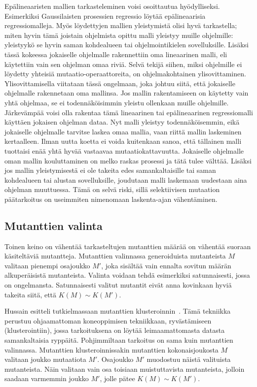 \documentclass{tktltiki}
\begin{document}
Epälineaaristen mallien tarkasteleminen voisi osoittautua hyödylliseksi. Esimerkiksi Gaussilaisten prosessien regressio löytää epälineaarisia regressiomalleja. Myös löydettyjen mallien yleistymistä olisi hyvä tarkastella; miten hyvin tämä joistain ohjelmista opittu malli yleistyy muille ohjelmille: yleistyykö se hyvin saman kohdealueen tai ohjelmointikielen sovelluksille. Lisäksi tässä kokeessa jokaiselle ohjelmalle rakennettiin oma lineaarinen malli, eli käytettiin vain sen ohjelman omaa riviä. Selvä tekijä siihen, miksi ohjelmille ei löydetty yhteisiä mutaatio-operaattoreita, on ohjelmakohtainen ylisovittaminen. Ylisovittamisella viitataan tässä ongelmaan, joka johtuu siitä, että jokaiselle ohjelmalle rakennetaan oma mallinsa. Jos mallin rakentamiseen on käytetty vain yhtä ohjelmaa, se ei todennäköisimmin yleistu ollenkaan muille ohjelmille. Järkevämpää voisi olla rakentaa tämä lineaarinen tai epälineaarinen regressiomalli käyttäen jokaisen ohjelman dataa. Nyt malli yleistyy todennäköisemmin, eikä jokaiselle ohjelmalle tarvitse laskea omaa mallia, vaan riittä mallin laskeminen kertaalleen. Ilman uutta koetta ei voida kuitenkaan sanoa, että tällainen malli tuottaisi enää yhtä hyvää vastaavaa mutaatiokattavuutta. Jokaiselle ohjelmalle oman mallin kouluttaminen on melko raskas prosessi ja tätä tulee välttää. Lisäksi jos mallin yleistymisestä ei ole takeita edes samankaltaisille tai saman kohdealueen tai alustan sovelluksille, joudutaan malli laskemaan uudestaan aina ohjelman muuttuessa. Tämä on selvä riski, sillä selektiivisen mutaation päätarkoitus on useimmiten nimenomaan laskenta-ajan vähentäminen.

\subsection{Mutanttien valinta}
Toinen keino on vähentää tarkasteltujen mutanttien määrää on vähentää suoraan käsiteltäviä mutantteja. Mutanttien valinnassa generoiduista mutanteista $M$ valitaan pienempi osajoukko $M'$, joka sisältää vain ennalta sovitun määrän alkuperäisistä mutanteista. Valinta voidaan tehdä esimerkiksi satunnaisesti, jossa on ongelmansta. Satunnaisesti valitut mutantit eivät anna kovinkaan hyviä takeita siitä, että $K(M) \sim K(M')$. 

Hussain esitteli tutkielmassaan mutanttien klusteroinnin~\cite{Hussain08}. Tämä tekniikka perustuu ohjaamattoman koneoppimisen tekniikkaan, ryvästämiseen (klusterointiin), jossa tarkoituksena on löytää leimaamattomasta datasta samankaltaisia ryppäitä. Pohjimmiltaan tarkoitus on sama kuin mutanttien valinnassa. Mutanttien klusteroinnissakin mutanttien kokonaisjoukosta $M$ valitaan joukko mutaatiota $M'$. Osajoukko $M'$ muodostuu näistä valituista mutanteista. Näin valitaan vain osa toisiaan muistuttavista mutanteista, jolloin saadaan varmemmin joukko $M'$, jolle pätee $K(M) \sim K(M')$. 
\end{document}
